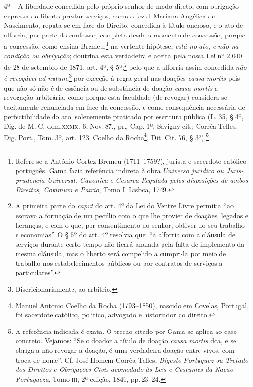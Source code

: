 4º -- A liberdade concedida pelo próprio senhor de modo direto, com
obrigação expressa do liberto prestar serviços, como o fez d.\,Mariana
Angélica do Nascimento, reputa-se em face do Direito, concedida à título
oneroso, e o ato de alforria, por parte do confessor, completo desde o
momento de concessão, porque a concessão, como ensina Bremeu,\footnote{
  Refere-se a António Cortez Bremeu (1711--1759?), jurista e sacerdote
  católico português. Gama fazia referência indireta à obra
  \emph{Universo juridico ou Juris-prudencia Universal, Canonica e
  Cesarea Regulada pelas disposições de ambos Direitos, Commum e
  Patrio}, Tomo I, Lisboa, 1749.} na vertente hipótese, \emph{está no
ato}, \emph{e não na condição ou obrigação}; doutrina esta verdadeira e
aceita pela nossa Lei nº 2.040 de 28 de setembro de 1871, art. 4º, §
5º;\footnote{ A primeira parte do \emph{caput} do art. 4º da Lei do
  Ventre Livre permitia ``ao escravo a formação de um pecúlio com o que
  lhe provier de doações, legados e heranças, e com o que, por
  consentimento do senhor, obtiver do seu trabalho e economias''. O § 5º
  do art. 4º resolvia que: ``a alforria com a cláusula de serviços
  durante certo tempo não ficará anulada pela falta de implemento da
  mesma cláusula, mas o liberto será compelido a cumpri-la por meio de
  trabalho nos estabelecimentos públicos ou por contratos de serviços a
  particulares''.} pelo que a alforria assim concedida \emph{não é
revogável ad nutum},\footnote{ Discricionariamente, ao arbítrio.} por
exceção à regra geral nas doações \emph{causa mortis} pois que não só
não é de essência ou de substância de doação \emph{causa mortis} a
revogação arbitrária, como porque esta faculdade (de revogar)
considera-se tacitamente renunciada em face da concessão, e como
consequência necessária de perfectibilidade do ato, solenemente
praticado por escritura pública (L. 35, § 4º, Dig. de M. C. dom.\textsc{xxxix},
6, Nov.\,87., pr., Cap. 1º, Savigny cit.; Corrêa Telles, Dig. Port., Tom.
3º, art. 123; Coelho da Rocha\footnote{ Manuel Antonio Coelho da Rocha
  (1793--1850), nascido em Covelas, Portugal, foi sacerdote católico,
  político, advogado e historiador do direito.}, Dit. Cit. 76, §
3º).\footnote{ A referência indicada é exata. O trecho citado por Gama
  se aplica ao caso concreto. Vejamos: ``Se o doador a título de doação
  \emph{causa mortis} doa, e se obriga a não revogar a doação, é uma
  verdadeira doação entre vivos, com troca de nome''. Cf. José Homem
  Corrêa Telles, \emph{Digesto Portuguez ou Tratado dos Direitos e
  Obrigações Civis acomodado às Leis e Costumes da Nação Portugueza},
  Tomo \textsc{iii}, 2ª edição, 1840, pp.\,23--24.}

